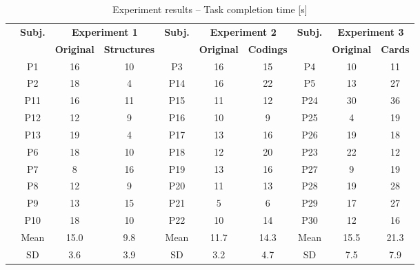 \documentclass{llncs}
\begin{document}
\begin{table}[!b]
	\centering
	\caption{Experiment results -- Task completion time [s]}
	\label{tb:tct}
	\begin{tabular}{|c||c|c|c||c|c|c||c|c|c|}
		\cline{2-10}
		\multicolumn{1}{c|}{\multirow{2}{*}{}} &
		\multirow{2}{*}{\textbf{Subj.}} & 
		\multicolumn{2}{c||}{\textbf{Experiment 1}} & 
		\multirow{2}{*}{\textbf{Subj.}} & 
		\multicolumn{2}{c||}{\textbf{Experiment 2}} & 
		\multirow{2}{*}{\textbf{Subj.}} & 
		\multicolumn{2}{c|}{\textbf{Experiment 3}} \\ \hhline{~~--||~--||~--}
		\multicolumn{1}{c|}{\multirow{2}{*}{}} & & 
		\multicolumn{1}{c|}{\textbf{Original}} & \textbf{Structures} & & 
		\multicolumn{1}{c|}{\textbf{Original}} & \textbf{Codings} & & 
		\multicolumn{1}{c|}{\textbf{Original}} & \textbf{Cards} \\ 
		\hhline{-b|===::===::===|}
		\multirow{5}{*}{\rotatebox[origin=c]{90}{Group 1}} &
		\multicolumn{1}{|c|}{P1} & 16 & 10 & \multicolumn{1}{|c|}{P3} & 16 & 15 
		& \multicolumn{1}{|c|}{P4} & 10 & 11 \\ 
		& \multicolumn{1}{|c|}{P2} & 18 & 4 & \multicolumn{1}{|c|}{P14} & 16 & 
		22 & \multicolumn{1}{|c|}{P5} & 13 & 27 \\
		& \multicolumn{1}{|c|}{P11} & 16 & 11 & \multicolumn{1}{|c|}{P15} & 11 
		& 12 & \multicolumn{1}{|c|}{P24} & 30 & 36 \\ 
		& \multicolumn{1}{|c|}{P12} & 12 & 9 & \multicolumn{1}{|c|}{P16} & 10 & 
		9 & \multicolumn{1}{|c|}{P25} & 4 & 19 \\ 
		& \multicolumn{1}{|c|}{P13} & 19 & 4 & \multicolumn{1}{|c|}{P17} & 13 & 
		16 & \multicolumn{1}{|c|}{P26} & 19 & 18 \\ \hhline{|=::===::===::===|}
		\multirow{5}{*}{\rotatebox[origin=c]{90}{Group 2}} & 
		\multicolumn{1}{|c|}{P6} & 18 & 10 & \multicolumn{1}{|c|}{P18} & 12 & 
		20 & \multicolumn{1}{|c|}{P23} & 22 & 12 \\ 
		& \multicolumn{1}{|c|}{P7} & 8 & 16 & \multicolumn{1}{|c|}{P19} & 13 & 
		16 & \multicolumn{1}{|c|}{P27} & 9 & 19 \\ 
		& \multicolumn{1}{|c|}{P8} & 12 & 9 & \multicolumn{1}{|c|}{P20} & 11 & 
		13 & \multicolumn{1}{|c|}{P28} & 19 & 28 \\ 
		& \multicolumn{1}{|c|}{P9} & 13 & 15 & \multicolumn{1}{|c|}{P21} & 5 & 
		6 & \multicolumn{1}{|c|}{P29} & 17 & 27 \\ 
		& \multicolumn{1}{|c|}{P10} & 18 & 10 & \multicolumn{1}{|c|}{P22} & 10 
		& 14 & \multicolumn{1}{|c|}{P30} & 12 & 16 \\ 
		\cline{1-1} \hhline{~|===::===::===|}
		\multicolumn{1}{c|}{} & \multicolumn{1}{|c|}{Mean} & 15.0 & 9.8 & 
		\multicolumn{1}{|c|}{Mean} 
		& 11.7 & 14.3 & \multicolumn{1}{|c|}{Mean} & 15.5 & 21.3 \\ 
		\hhline{~---||---||---}
		\multicolumn{1}{c|}{} & \multicolumn{1}{|c|}{SD} & 3.6 & 3.9 & 
		\multicolumn{1}{|c|}{SD} & 3.2 
		& 4.7 & \multicolumn{1}{|c|}{SD} & 7.5 & 7.9 \\ \cline{2-10}
	\end{tabular}
\end{table}
\end{document}
